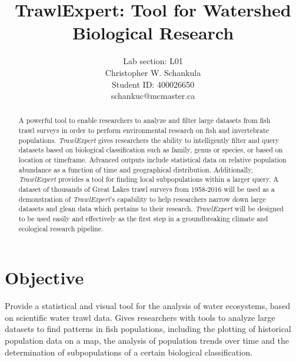 \documentclass{article}
\begin{document}
\title{TrawlExpert: Tool for Watershed Biological Research}
\author{Lab section: L01 \\ Christopher W. Schankula \\Student ID: 400026650 \\schankuc@mcmaster.ca}

\maketitle

\begin{abstract}
\noindent A powerful tool to enable researchers to analyze and filter large datasets from fish trawl surveys in order to perform environmental research on fish and invertebrate populations. \textit{TrawlExpert} gives researchers the ability to intelligently filter and query datasets based on biological classification such as family, genus or species, or based on location or timeframe. Advanced outputs include statistical data on relative population abundance as a function of time and geographical distribution. Additionally, \textit{TrawlExpert} provides a tool for finding local subpopulations within a larger query. A dataset of thousands of Great Lakes trawl surveys from 1958-2016 will be used as a demonstration of \textit{TrawlExpert}'s capability to help researchers narrow down large datasets and glean data which pertains to their research. \textit{TrawlExpert} will be designed to be used easily and effectively as the first step in a groundbreaking climate and ecological research pipeline.

\end{abstract}

\section{Objective}
Provide a statistical and visual tool for the analysis of water ecosystems, based on scientific water trawl data. Gives researchers with tools to analyze large datasets to find patterns in fish populations, including the plotting of historical population data on a map, the analysis of population trends over time and the determination of subpopulations of a certain biological classification.
\end{document}
